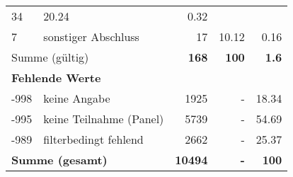 \begin{longtable}{lXrrr}
       \num{34} &
       \num[round-mode=places,round-precision=2]{20,24} &
         \num[round-mode=places,round-precision=2]{0,32} \\

     7 &
     \multicolumn{1}{X}{ sonstiger Abschluss   } &


       \num{17} &
       \num[round-mode=places,round-precision=2]{10,12} &
         \num[round-mode=places,round-precision=2]{0,16} \\
     \midrule
     \multicolumn{2}{l}{Summe (gültig)} &
       \textbf{\num{168}} &
     \textbf{100} &
       \textbf{\num[round-mode=places,round-precision=2]{1,6}} \\
     \multicolumn{5}{l}{\textbf{Fehlende Werte}}\\
       -998 &
       keine Angabe &
         \num{1925} &
        - &
         \num[round-mode=places,round-precision=2]{18,34} \\
       -995 &
       keine Teilnahme (Panel) &
         \num{5739} &
        - &
         \num[round-mode=places,round-precision=2]{54,69} \\
       -989 &
       filterbedingt fehlend &
         \num{2662} &
        - &
         \num[round-mode=places,round-precision=2]{25,37} \\
     \midrule
     \multicolumn{2}{l}{\textbf{Summe (gesamt)}} &
          \textbf{\num{10494}} &
        \textbf{-} &
        \textbf{100} \\
     \bottomrule
     \end{longtable}
     
